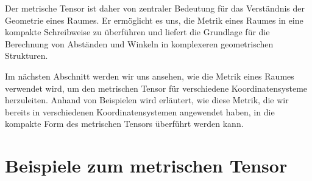 Der metrische Tensor ist daher von zentraler Bedeutung für das Verständnis der Geometrie eines Raumes.
Er ermöglicht es uns, die Metrik eines Raumes in eine kompakte Schreibweise zu überführen und liefert die Grundlage für die Berechnung von Abständen und Winkeln in komplexeren geometrischen Strukturen.

Im nächsten Abschnitt werden wir uns ansehen, wie die Metrik eines Raumes verwendet wird, um den metrischen Tensor für verschiedene Koordinatensysteme herzuleiten.
Anhand von Beispielen wird erläutert, wie diese Metrik, die wir bereits in verschiedenen Koordinatensystemen angewendet haben, in die kompakte Form des metrischen Tensors überführt werden kann.


\section{Beispiele zum metrischen Tensor}





